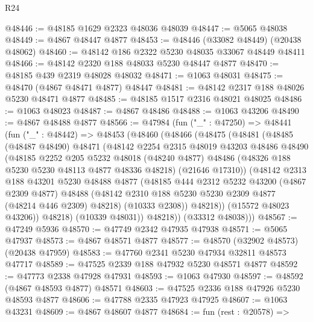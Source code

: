 \begin{lexlean}{R24}
\begin{coremodule}
@48446 := @48185 @1629 @2323 @48036 @48039
@48447 := @5065 @48038
@48449 := @4867 @48447 @4877
@48453 := @48446 (@33082 @48449) (@20438 @48062)
@48460 := @48142 @186 @2322 @5230 @48035 @33067 @48449 @48411
@48466 := @48142 @2320 @188 @48033 @5230 @48447 @4877
@48470 := @48185 @439 @2319 @48028 @48032
@48471 := @1063 @48031
@48475 := @48470 (@4867 @48471 @4877) @48447
@48481 := @48142 @2317 @188 @48026 @5230 @48471 @4877
@48485 := @48185 @1517 @2316 @48021 @48025
@48486 := @1063 @48023
@48487 := @4867 @48486
@48488 := @1063 @43206
@48490 := @4867 @48488 @4877
@48566 := @47984
    (fun ("_" : @47250) =>
    @48441
      (fun ("_" : @48442) =>
      @48453
        (@48460
          (@48466
            (@48475
              (@48481
                (@48485
                  (@48487 @48490)
                  @48471
                  (@48142
                    @2254
                    @2315
                    @48019
                    @43203
                    @48486
                    @48490
                    (@48185
                      @2252
                      @205
                      @5232
                      @48018
                      (@48240 @4877)
                      @48486
                      (@48326 @188 @5230 @5230 @48113 @4877 @48336 @48218)
                      (@21646 @17310))
                    (@48142
                      @2313
                      @188
                      @43201
                      @5230
                      @48488
                      @4877
                      (@48185
                        @444
                        @2312
                        @5232
                        @43200
                        (@4867 @2309 @4877)
                        @48488
                        (@48142 @2310 @188 @5230 @5230 @2309 @4877 (@48214 @446 @2309) @48218)
                        (@10333 @2308))
                      @48218))
                  (@15572 @48023 @43206))
                @48218)
              (@10339 @48031))
            @48218))
        (@33312 @48038)))
@48567 := @47249 @5936
@48570 := @47749 @2342 @47935 @47938
@48571 := @5065 @47937
@48573 := @4867 @48571 @4877
@48577 := @48570 (@32902 @48573) (@20438 @47959)
@48583 := @47760 @2341 @5230 @47934 @32811 @48573 @47717
@48589 := @47525 @2339 @188 @47932 @5230 @48571 @4877
@48592 := @47773 @2338 @47928 @47931
@48593 := @1063 @47930
@48597 := @48592 (@4867 @48593 @4877) @48571
@48603 := @47525 @2336 @188 @47926 @5230 @48593 @4877
@48606 := @47788 @2335 @47923 @47925
@48607 := @1063 @43231
@48609 := @4867 @48607 @4877
@48684 := fun (rest : @20578) =>

\end{coremodule}
\end{lexlean}

